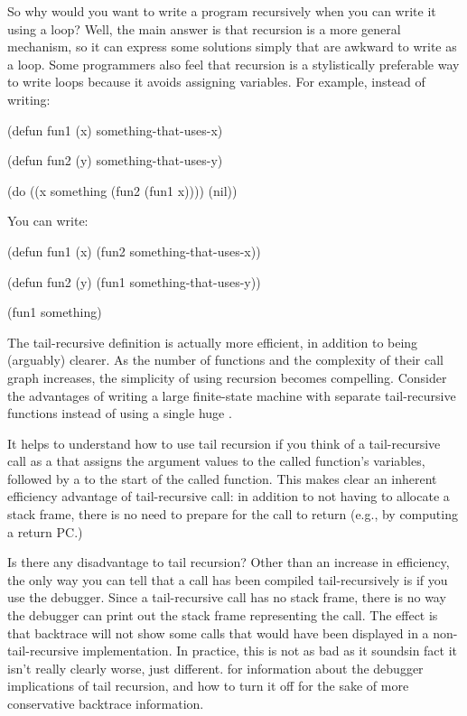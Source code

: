 So why would you want to write a program recursively when you can write it
using a loop?  Well, the main answer is that recursion is a more general
mechanism, so it can express some solutions simply that are awkward to write as
a loop.  Some programmers also feel that recursion is a stylistically
preferable way to write loops because it avoids assigning variables.
For example, instead of writing:

\begin{lisp}
(defun fun1 (x)
  something-that-uses-x)

(defun fun2 (y)
  something-that-uses-y)

(do ((x something (fun2 (fun1 x))))
    (nil))
\end{lisp}

You can write:

\begin{lisp}
(defun fun1 (x)
  (fun2 something-that-uses-x))

(defun fun2 (y)
  (fun1 something-that-uses-y))

(fun1 something)
\end{lisp}

The tail-recursive definition is actually more efficient, in addition to being
(arguably) clearer.  As the number of functions and the complexity of their
call graph increases, the simplicity of using recursion becomes compelling.
Consider the advantages of writing a large finite-state machine with separate
tail-recursive functions instead of using a single huge .

It helps to understand how to use tail recursion if you think of a
tail-recursive call as a  that assigns the argument values to the
called function's variables, followed by a  to the start of the called
function.  This makes clear an inherent efficiency advantage of tail-recursive
call: in addition to not having to allocate a stack frame, there is no need to
prepare for the call to return (e.g., by computing a return PC.)

Is there any disadvantage to tail recursion?  Other than an increase
in efficiency, the only way you can tell that a call has been compiled
tail-recursively is if you use the debugger.  Since a tail-recursive
call has no stack frame, there is no way the debugger can print out
the stack frame representing the call.  The effect is that backtrace
will not show some calls that would have been displayed in a
non-tail-recursive implementation.  In practice, this is not as bad as
it sounds\dash{}in fact it isn't really clearly worse, just different.
 for information about the debugger
implications of tail recursion, and how to turn it off for the sake of
more conservative backtrace information.

